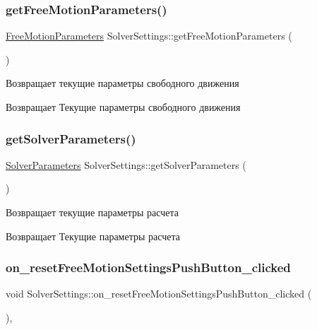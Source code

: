 \subsubsection{\texorpdfstring{get\+Free\+Motion\+Parameters()}{getFreeMotionParameters()}}
{\footnotesize\ttfamily \mbox{\hyperlink{struct_free_motion_parameters}{Free\+Motion\+Parameters}} Solver\+Settings\+::get\+Free\+Motion\+Parameters (\begin{DoxyParamCaption}{ }\end{DoxyParamCaption})}

Возвращает текущие параметры свободного движения \begin{DoxyReturn}{Возвращает}
Текущие параметры свободного движения 
\end{DoxyReturn}
\mbox{\label{class_solver_settings_aef7243e388288a838bfc1cb0bfece815}} 
\subsubsection{\texorpdfstring{get\+Solver\+Parameters()}{getSolverParameters()}}
{\footnotesize\ttfamily \mbox{\hyperlink{struct_solver_parameters}{Solver\+Parameters}} Solver\+Settings\+::get\+Solver\+Parameters (\begin{DoxyParamCaption}{ }\end{DoxyParamCaption})}

Возвращает текущие параметры расчета \begin{DoxyReturn}{Возвращает}
Текущие параметры расчета 
\end{DoxyReturn}
\mbox{\label{class_solver_settings_a9d3176e0bf47b4d8ab9969f9e3b359ab}} 
\subsubsection{\texorpdfstring{on\+\_\+reset\+Free\+Motion\+Settings\+Push\+Button\+\_\+clicked}{on\_resetFreeMotionSettingsPushButton\_clicked}}
{\footnotesize\ttfamily void Solver\+Settings\+::on\+\_\+reset\+Free\+Motion\+Settings\+Push\+Button\+\_\+clicked (\begin{DoxyParamCaption}{ }\end{DoxyParamCaption})\hspace{0.3cm}{\ttfamily [private]}, {\ttfamily [slot]}}

